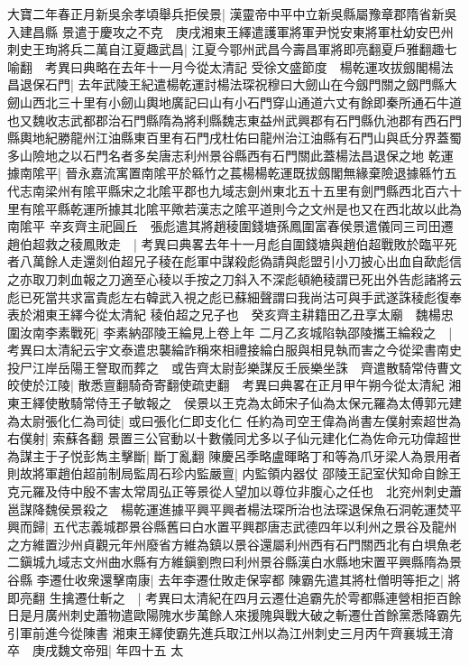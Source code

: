 大寶二年春正月新吳余孝頃舉兵拒侯景|{
	漢靈帝中平中立新吳縣屬豫章郡隋省新吳入建昌縣}
景遣于慶攻之不克　庚戌湘東王繹遣護軍將軍尹悦安東將軍杜幼安巴州刺史王珣將兵二萬自江夏趣武昌|{
	江夏今鄂州武昌今壽昌軍將即亮翻夏戶雅翻趣七喻翻　考異曰典略在去年十一月今從太清記}
受徐文盛節度　楊乾運攻拔劔閣楊法昌退保石門|{
	去年武陵王紀遣楊乾運討楊法琛祝穆曰大劒山在今劔門關之劔門縣大劒山西北三十里有小劒山輿地廣記曰山有小石門穿山通道六丈有餘即秦所通石牛道也又魏收志武都郡治石門縣隋為將利縣魏志東益州武興郡有石門縣仇池郡有西石門縣輿地紀勝龍州江油縣東百里有石門戌杜佑曰龍州治江油縣有石門山與氐分界蓋蜀多山險地之以石門名者多矣唐志利州景谷縣西有石門關此蓋楊法昌退保之地}
乾運據南隂平|{
	晉永嘉流寓置南隂平於緜竹之萇楊楊乾運既拔劔閣無緣棄險退據緜竹五代志南梁州有隂平縣宋之北隂平郡也九域志劍州東北五十五里有劍門縣西北百六十里有隂平縣乾運所據其北隂平歟若漢志之隂平道則今之文州是也又在西北故以此為南隂平}
辛亥齊主祀圓丘　張彪遣其將趙稜圍錢塘孫鳳圍富春侯景遣儀同三司田遷趙伯超救之稜鳳敗走　|{
	考異曰典畧去年十一月彪自圍錢塘與趙伯超戰敗於臨平死者八萬餘人走還剡伯超兄子稜在彪軍中謀殺彪偽請與彪盟引小刀披心出血自歃彪信之亦取刀刺血報之刀適至心稜以手按之刀斜入不深彪頓絶稜謂已死出外告彪諸將云彪已死當共求富貴彪左右韓武入視之彪已蘇細聲謂曰我尚沽可與手武遂誅稜彪復奉表於湘東王繹今從太清紀}
稜伯超之兄子也　癸亥齊主耕籍田乙丑享太廟　魏楊忠圍汝南李素戰死|{
	李素納邵陵王綸見上卷上年}
二月乙亥城陷執邵陵攜王綸殺之　|{
	考異曰太清紀云宇文泰遣忠襲綸詐稱來相禮接綸白服與相見執而害之今從梁書南史}
投尸江岸岳陽王詧取而葬之　或告齊太尉彭樂謀反壬辰樂坐誅　齊遣散騎常侍曹文皎使於江陵|{
	散悉亶翻騎奇寄翻使疏吏翻　考異曰典畧在正月甲午朔今從太清紀}
湘東王繹使散騎常侍王子敏報之　侯景以王克為太師宋子仙為太保元羅為太傅郭元建為太尉張化仁為司徒|{
	或曰張化仁即支化仁}
任約為司空王偉為尚書左僕射索超世為右僕射|{
	索蘇各翻}
景置三公官動以十數儀同尤多以子仙元建化仁為佐命元功偉超世為謀主于子悦彭雋主擊斷|{
	斷丁亂翻}
陳慶呂季略盧暉略丁和等為爪牙梁人為景用者則故將軍趙伯超前制局監周石珍内監嚴亶|{
	内監領内器仗}
邵陵王記室伏知命自餘王克元羅及侍中殷不害太常周弘正等景從人望加以尊位非腹心之任也　北兖州刺史蕭邕謀降魏侯景殺之　楊乾運進據平興平興者楊法琛所治也法琛退保魚石洞乾運焚平興而歸|{
	五代志義城郡景谷縣舊曰白水置平興郡唐志武德四年以利州之景谷及龍州之方維置沙州貞觀元年州廢省方維為鎮以景谷還屬利州西有石門關西北有白埧魚老二鎭城九域志文州曲水縣有方維鎭劉煦曰利州景谷縣漢白水縣地宋置平興縣隋為景谷縣}
李遷仕收衆還擊南康|{
	去年李遷仕敗走保寜都}
陳霸先遣其將杜僧明等拒之|{
	將即亮翻}
生擒遷仕斬之　|{
	考異曰太清紀在四月云遷仕追霸先於雩都縣連營相拒百餘日是月廣州刺史蕭物遣歐陽隗水步萬餘人來援隗與戰大破之斬遷仕首餘黨悉降霸先引軍前進今從陳書}
湘東王繹使霸先進兵取江州以為江州刺史三月丙午齊襄城王淯卒　庚戌魏文帝殂|{
	年四十五}
太

